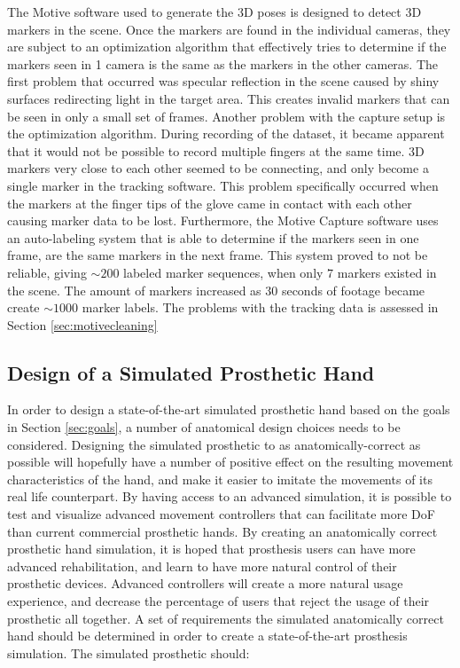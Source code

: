 \documentclass[../main.tex]{subfiles}
\begin{document}
The  Motive software used to generate the 3D poses is designed to detect 3D markers in the scene.
Once the markers are found in the individual cameras, they are subject to an optimization algorithm that effectively tries to determine if the markers seen in 1 camera is the same as the markers in the other cameras.
The first problem that occurred was \gls{specular reflection} in the scene caused by shiny surfaces redirecting light in the target area.
This creates invalid markers that can be seen in only a small set of frames.
Another problem with the capture setup is the optimization algorithm.
During recording of the dataset, it became apparent that it would not be possible to record multiple fingers at the same time.
3D markers very close to each other seemed to be connecting, and only become a single marker in the tracking software.
This problem specifically occurred when the markers at the finger tips of the glove came in contact with each other causing marker data to be lost.
Furthermore, the Motive Capture software uses an auto-labeling system that is able to determine if the markers seen in one frame, are the same markers in the next frame.
This system proved to not be reliable, giving $\sim 200$ labeled marker sequences, when only $7$ markers existed in the scene.
The amount of markers increased as 30 seconds of footage became create $\sim 1000$ marker labels.
The problems with the tracking data is assessed in Section \ref{sec:motivecleaning}

\subsection{Design of a Simulated Prosthetic Hand}
\label{sec:prost_sim}

In order to design a state-of-the-art simulated prosthetic hand based on the goals in Section \ref{sec:goals}, a number of anatomical design choices needs to be considered.
Designing the simulated prosthetic to as anatomically-correct as possible will hopefully have a number of positive effect on the resulting movement characteristics of the hand, and make it easier to imitate the movements of its real life counterpart.
By having access to an advanced simulation, it is possible to test and visualize advanced movement controllers that can facilitate more \gls{DoF} than current commercial prosthetic hands. 
By creating an anatomically correct prosthetic hand simulation, it is hoped that prosthesis users can have more advanced rehabilitation, and learn to have more natural control of their prosthetic devices.
Advanced controllers will create a more natural usage experience, and decrease the percentage of users that reject the usage of their prosthetic all together.
A set of requirements the simulated anatomically correct hand should be determined in order to create a state-of-the-art prosthesis simulation.
The simulated prosthetic should:
\end{document}
